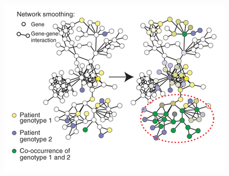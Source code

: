 \begin{frame}[fragile] \frametitle{}
    \includegraphics[width=\textwidth]{img/network_smoothing.png}
\end{frame}


